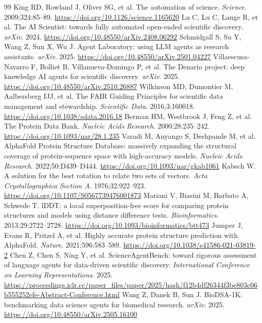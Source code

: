 \documentclass[11pt]{article}
\begin{document}
\begin{thebibliography}{99}
 King RD, Rowland J, Oliver SG, et al. The automation of science. \emph{Science}. 2009;324:85--89. \url{https://doi.org/10.1126/science.1165620}
 Lu C, Lu C, Lange R, et al. The AI Scientist: towards fully automated open-ended scientific discovery. \emph{arXiv}. 2024. \url{https://doi.org/10.48550/arXiv.2408.06292}
 Schmidgall S, Su Y, Wang Z, Sun X, Wu J. Agent Laboratory: using LLM agents as research assistants. \emph{arXiv}. 2025. \url{https://doi.org/10.48550/arXiv.2501.04227}
 Villaescusa-Navarro F, Bolliet B, Villanueva-Domingo P, et al. The Denario project: deep knowledge AI agents for scientific discovery. \emph{arXiv}. 2025. \url{https://doi.org/10.48550/arXiv.2510.26887}
 Wilkinson MD, Dumontier M, Aalbersberg IJJ, et al. The FAIR Guiding Principles for scientific data management and stewardship. \emph{Scientific Data}. 2016;3:160018. \url{https://doi.org/10.1038/sdata.2016.18}
 Berman HM, Westbrook J, Feng Z, et al. The Protein Data Bank. \emph{Nucleic Acids Research}. 2000;28:235--242. \url{https://doi.org/10.1093/nar/28.1.235}
 Varadi M, Anyango S, Deshpande M, et al. AlphaFold Protein Structure Database: massively expanding the structural coverage of protein-sequence space with high-accuracy models. \emph{Nucleic Acids Research}. 2022;50:D439--D444. \url{https://doi.org/10.1093/nar/gkab1061}
 Kabsch W. A solution for the best rotation to relate two sets of vectors. \emph{Acta Crystallographica Section A}. 1976;32:922--923. \url{https://doi.org/10.1107/S0567739476001873}
 Mariani V, Biasini M, Barbato A, Schwede T. lDDT: a local superposition-free score for comparing protein structures and models using distance difference tests. \emph{Bioinformatics}. 2013;29:2722--2728. \url{https://doi.org/10.1093/bioinformatics/btt473}
 Jumper J, Evans R, Pritzel A, et al. Highly accurate protein structure prediction with AlphaFold. \emph{Nature}. 2021;596:583--589. \url{https://doi.org/10.1038/s41586-021-03819-2}
 Chen Z, Chen S, Ning Y, et al. ScienceAgentBench: toward rigorous assessment of language agents for data-driven scientific discovery. \emph{International Conference on Learning Representations}. 2025. \url{https://proceedings.iclr.cc/paper_files/paper/2025/hash/f12b4df26344f3be803c06b555252efe-Abstract-Conference.html}
 Wang Z, Danek B, Sun J. BioDSA-1K: benchmarking data science agents for biomedical research. \emph{arXiv}. 2025. \url{https://doi.org/10.48550/arXiv.2505.16100}

\end{thebibliography}
\end{document}
